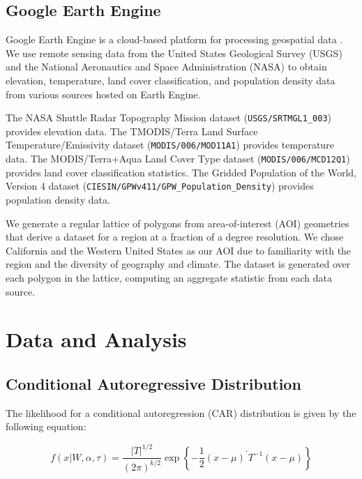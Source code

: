 \documentclass[notitlepage]{article}
\begin{document}
\subsection{Google Earth Engine}

Google Earth Engine is a cloud-based platform for processing geospatial data \cite{gorelick_google_2017}.
We use remote sensing data from the United States Geological Survey (USGS) and the National Aeronautics and Space Administration (NASA) to obtain elevation, temperature, land cover classification, and population density data from various sources hosted on Earth Engine.

The NASA Shuttle Radar Topography Mission dataset (\texttt{USGS/SRTMGL1\_003}) \cite{nasa_srtmg} provides elevation data.
The TMODIS/Terra Land Surface Temperature/Emissivity dataset (\texttt{MODIS/006/MOD11A1}) \cite{wan_zhengming_mod11a1_2015} provides temperature data.
The MODIS/Terra+Aqua Land Cover Type dataset (\texttt{MODIS/006/MCD12Q1}) \cite{friedl_mark_mcd12q1_2019} provides land cover classification statistics.
The Gridded Population of the World, Version 4 dataset (\texttt{CIESIN/GPWv411/GPW\_Population\_Density}) \cite{gpwv4} provides population density data.

We generate a regular lattice of polygons from area-of-interest (AOI) geometries that derive a dataset for a region at a fraction of a degree resolution.
We chose California and the Western United States as our AOI due to familiarity with the region and the diversity of geography and climate.
The dataset is generated over each polygon in the lattice, computing an aggregate statistic from each data source.

\section{Data and Analysis}

\subsection{Conditional Autoregressive Distribution}

The likelihood for a conditional autoregression (CAR) distribution is given by the following equation:

\begin{equation}
f(x|W, \alpha, \tau) =
    \frac{|T|^{1/2}}{(2\pi)^{k/2}}
    \exp \left\{
        -\frac{1}{2} (x - \mu)^\prime T^{-1} (x - \mu)
    \right\}
\end{equation}
\end{document}
